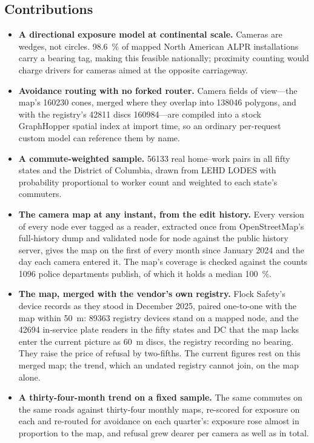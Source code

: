 \documentclass[11pt,twoside]{article}
\newcommand{\alpr}{ALPR\xspace}
\begin{document}
\subsection{Contributions}

\begin{itemize}
  \item \textbf{A directional exposure model at continental scale.} Cameras are wedges,
    not circles. \SI{98.6}{\percent} of mapped North American \alpr installations carry a
    bearing tag, making this feasible nationally; proximity counting would charge drivers
    for cameras aimed at the opposite carriageway.
  \item \textbf{Avoidance routing with no forked router.} Camera fields of view---the map's
    \num{160230} cones, merged where they overlap into \num{138046} polygons, and with the
    registry's \num{42811} discs \num{160984}---are
    compiled into a stock GraphHopper spatial index at import time, so an ordinary per-request
    custom model can reference them by name.
  \item \textbf{A commute-weighted sample.} \num{56133} real home--work pairs in all fifty
    states and the District of Columbia, drawn from LEHD LODES with probability proportional
    to worker count and weighted to each state's commuters.
  \item \textbf{The camera map at any instant, from the edit history.} Every version of every
    node ever tagged as a reader, extracted once from OpenStreetMap's full-history dump and
    validated node for node against the public history server, gives the map on the first of
    every month since January 2024 and the day each camera entered it. The map's coverage is
    checked against the counts \num{1096} police departments publish, of which it holds a
    median \SI{100}{\percent}.
  \item \textbf{The map, merged with the vendor's own registry.} Flock Safety's device
    records as they stood in December 2025, paired one-to-one with the map within
    \SI{50}{\metre}: \num{89363} registry devices stand on a mapped node, and the \num{42694}
    in-service plate readers in the fifty states and DC that the map lacks enter the current
    picture as \SI{60}{\metre} discs, the registry recording no bearing. They raise the price
    of refusal by two-fifths. The current figures rest on this merged map; the trend, which an
    undated registry cannot join, on the map alone.
  \item \textbf{A thirty-four-month trend on a fixed sample.} The same commutes on the same
    roads against thirty-four monthly maps, re-scored for exposure on each and re-routed for
    avoidance on each quarter's: exposure rose almost in proportion to the map, and refusal
    grew dearer per camera as well as in total.
\end{itemize}
\end{document}
